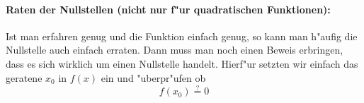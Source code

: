 \paragraph{Raten der Nullstellen (nicht nur f"ur quadratischen Funktionen):}
Ist man erfahren genug und die Funktion einfach genug, so kann man h"aufig die Nullstelle auch einfach erraten. Dann muss man noch einen Beweis erbringen, dass es sich wirklich um einen Nullstelle handelt. Hierf"ur setzten wir einfach das geratene $x_0$ in $f(x)$ ein und "uberpr"ufen ob 
\begin{equation*}
f(x_0) \stackrel{?}{=} 0
\end{equation*}

